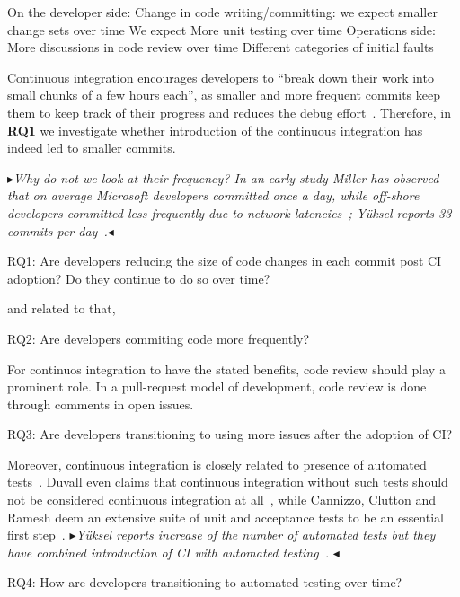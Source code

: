 \documentclass[conference]{IEEEtran}
\newcommand{\nnbb}[2]{
    \fbox{\bfseries\sffamily\scriptsize#1}
    {\sf\small$\blacktriangleright$\textit{#2}$\blacktriangleleft$}
   }
\newcommand{\as}[1]{\nnbb{Alexander}{#1}}
\begin{document}
On the developer side:
Change in code writing/committing: we expect smaller change sets over time
We expect More unit testing over time
Operations side:
More discussions in code review over time
Different categories of initial faults

Continuous integration encourages developers to ``break down their work into small chunks of a few hours each'', as smaller and more frequent commits keep them to keep track of their progress and reduces the debug effort~\cite{Fowler,Duvall}. %
Therefore, in \textbf{RQ1} we investigate whether introduction of the continuous integration has indeed led to smaller commits.
\as{Why do not we look at their frequency? In an early study Miller has observed that on average Microsoft developers committed once a day, while off-shore developers committed less frequently due to network latencies~\cite{Miller}; Y\"{u}ksel reports 33 commits per day~\cite{Yuksel}.}

RQ1: Are developers reducing the size of code changes in each commit post CI adoption? Do they continue to do so over time?

and related to that,

RQ2: Are developers commiting code more frequently?

For continuos integration to have the stated benefits, code review should play a prominent role. In a pull-request model of development, code review is done through comments in open issues.

RQ3: Are developers transitioning to using more issues after the adoption of CI?


Moreover, continuous integration is closely related to presence of automated tests~\cite{Fowler}. Duvall even claims that continuous integration without such tests should not be considered continuous integration at all~\cite{Duvall}, while Cannizzo, Clutton and Ramesh deem an extensive suite of unit and acceptance tests to be an essential first step~\cite{CannizzoCluttonRamesh}. \as{Y\"{u}ksel reports increase of the number of automated tests but they have combined introduction of CI with automated testing~\cite{Yuksel}. }

RQ4: How are developers transitioning to automated testing over time?




\end{document}
